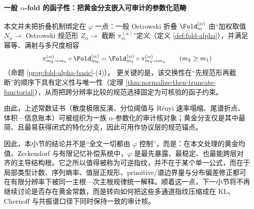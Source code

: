 \paragraph{一般 \texorpdfstring{$\alpha$}{alpha}-fold 的函子性：把黄金分支嵌入可审计的参数化范畴}
本文并未把折叠机制绑定在 \(\varphi\) 一点：一般 Ostrowski 折叠
\(\Fold_m^{(\alpha)}\)
由“加权取值 \(N_\alpha\)\(\to\) Ostrowski 规范形 \(Z_\alpha\)\(\to\) 截断 \(\pi_m^{(\alpha)}\)”定义（定义 \ref{def:fold-alpha}），并满足幂等、满射与多尺度相容
\[
\pi^{(\alpha)}_{m_2\to m_1}\circ \Fold^{(\alpha)}_{m_2}
=\Fold^{(\alpha)}_{m_1}\circ \pi^{(\alpha)}_{m_2\to m_1}
\qquad(m_2\ge m_1)
\]
（命题 \ref{prop:fold-alpha-basic}-(4)）。
更关键的是，该交换性在“先规范形再截断”的顺序下具有定义性与唯一性（定理 \ref{thm:normalize-then-truncate-functorial}），从而把跨分辨率比较的规范选择固定为可核验的函子约束。
\par
由此，上述常数证书（散度极限反演、分位阈值与 R\'enyi 速率塌缩、尾谱折点、体积—信息账本）可被组织为一族 \(\alpha\)-参数化的审计核对象；黄金分支仅是其中最简、且最易获得闭式的特化分支，因此可用作协议层的规范锚点。

因此，本小节的结论并不是“全文一切都由 \(\varphi\) 控制”，而是：在本文处理的黄金均值、Zeckendorf 与有限记忆补偿系统中，\(\varphi\) 是最先暴露、最稳定、也最能跨层对齐的主导结构根。它之所以值得被称为可逆指纹，并不在于某个单一公式，而在于局部类型计数、序列熵率、值层正规形、primitive/谱边界量与分布偏差修正都可在有限分辨率下被同一主根—次主根规律统一解释。顺着这一点，下一小节将不再继续讨论是否存在黄金常数，而是转向如何把这些多通道指纹压缩成在 KL、Chernoff 与共振谱口径下同时保持一致的审计核。
